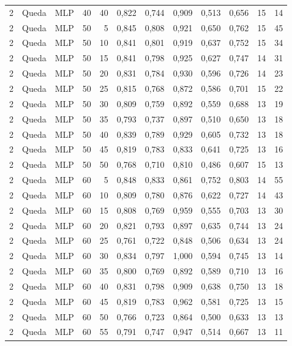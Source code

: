 \begin{longtable}{ccclrrrrrrrr}
2 & Queda & MLP & 40 & 40 & 0,822 & 0,744 & 0,909 & 0,513 & 0,656 & 15 & 14 \\
2 & Queda & MLP & 50 & 5 & 0,845 & 0,808 & 0,921 & 0,650 & 0,762 & 15 & 45 \\
2 & Queda & MLP & 50 & 10 & 0,841 & 0,801 & 0,919 & 0,637 & 0,752 & 15 & 34 \\
2 & Queda & MLP & 50 & 15 & 0,841 & 0,798 & 0,925 & 0,627 & 0,747 & 14 & 31 \\
2 & Queda & MLP & 50 & 20 & 0,831 & 0,784 & 0,930 & 0,596 & 0,726 & 14 & 23 \\
2 & Queda & MLP & 50 & 25 & 0,815 & 0,768 & 0,872 & 0,586 & 0,701 & 15 & 22 \\
2 & Queda & MLP & 50 & 30 & 0,809 & 0,759 & 0,892 & 0,559 & 0,688 & 13 & 19 \\
2 & Queda & MLP & 50 & 35 & 0,793 & 0,737 & 0,897 & 0,510 & 0,650 & 13 & 18 \\
2 & Queda & MLP & 50 & 40 & 0,839 & 0,789 & 0,929 & 0,605 & 0,732 & 13 & 18 \\
2 & Queda & MLP & 50 & 45 & 0,819 & 0,783 & 0,833 & 0,641 & 0,725 & 13 & 16 \\
2 & Queda & MLP & 50 & 50 & 0,768 & 0,710 & 0,810 & 0,486 & 0,607 & 15 & 13 \\
2 & Queda & MLP & 60 & 5 & 0,848 & 0,833 & 0,861 & 0,752 & 0,803 & 14 & 55 \\
2 & Queda & MLP & 60 & 10 & 0,809 & 0,780 & 0,876 & 0,622 & 0,727 & 14 & 43 \\
2 & Queda & MLP & 60 & 15 & 0,808 & 0,769 & 0,959 & 0,555 & 0,703 & 13 & 30 \\
2 & Queda & MLP & 60 & 20 & 0,821 & 0,793 & 0,897 & 0,635 & 0,744 & 13 & 24 \\
2 & Queda & MLP & 60 & 25 & 0,761 & 0,722 & 0,848 & 0,506 & 0,634 & 13 & 24 \\
2 & Queda & MLP & 60 & 30 & 0,834 & 0,797 & 1,000 & 0,594 & 0,745 & 13 & 14 \\
2 & Queda & MLP & 60 & 35 & 0,800 & 0,769 & 0,892 & 0,589 & 0,710 & 13 & 16 \\
2 & Queda & MLP & 60 & 40 & 0,831 & 0,798 & 0,909 & 0,638 & 0,750 & 13 & 18 \\
2 & Queda & MLP & 60 & 45 & 0,819 & 0,783 & 0,962 & 0,581 & 0,725 & 13 & 15 \\
2 & Queda & MLP & 60 & 50 & 0,766 & 0,723 & 0,864 & 0,500 & 0,633 & 13 & 13 \\
2 & Queda & MLP & 60 & 55 & 0,791 & 0,747 & 0,947 & 0,514 & 0,667 & 13 & 11 \\

\end{longtable}
